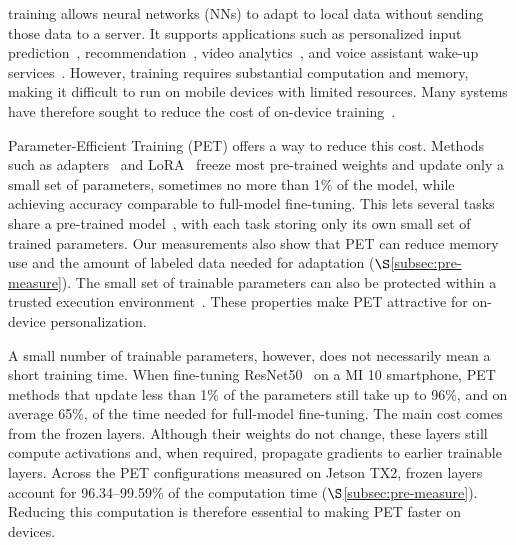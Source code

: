 \begingroup
\color{blue}
 training allows neural networks (NNs) to adapt to local data without sending those data to a server.
It supports applications such as personalized input prediction~\cite{xu2018deeptype}, recommendation~\cite{han2021deeprec}, video analytics~\cite{bhardwaj2022ekya}, and voice assistant wake-up services~\cite{siri}.
However, training requires substantial computation and memory, making it difficult to run on mobile devices with limited resources.
Many systems have therefore sought to reduce the cost of on-device training~\cite{huang2023elastictrainer, xu2022mandheling, 10.1145/3295500.3356156, mercury2021sensys, 10.1145/3384419.3430716, zhu2023pockengine, tflite, tfjs, MNN}.

Parameter-Efficient Training (PET) offers a way to reduce this cost.
Methods such as adapters~\cite{houlsby2019parameter, rebuffi2017learning} and LoRA~\cite{hu2021lora} freeze most pre-trained weights and update only a small set of parameters, sometimes no more than 1\% of the model, while achieving accuracy comparable to full-model fine-tuning.
This lets several tasks share a pre-trained model~\cite{yuan2023rethinking, yang2023edgefm}, with each task storing only its own small set of trained parameters.
Our measurements also show that PET can reduce memory use and the amount of labeled data needed for adaptation ($\S$\ref{subsec:pre-measure}).
The small set of trainable parameters can also be protected within a trusted execution environment~\cite{zhang2023no}.
These properties make PET attractive for on-device personalization.

A small number of trainable parameters, however, does not necessarily mean a short training time.
When fine-tuning ResNet50~\cite{he2015deep} on a MI 10 smartphone, PET methods that update less than 1\% of the parameters still take up to 96\%, and on average 65\%, of the time needed for full-model fine-tuning.
The main cost comes from the frozen layers.
Although their weights do not change, these layers still compute activations and, when required, propagate gradients to earlier trainable layers.
Across the PET configurations measured on Jetson TX2, frozen layers account for 96.34--99.59\% of the computation time ($\S$\ref{subsec:pre-measure}).
Reducing this computation is therefore essential to making PET faster on devices.

